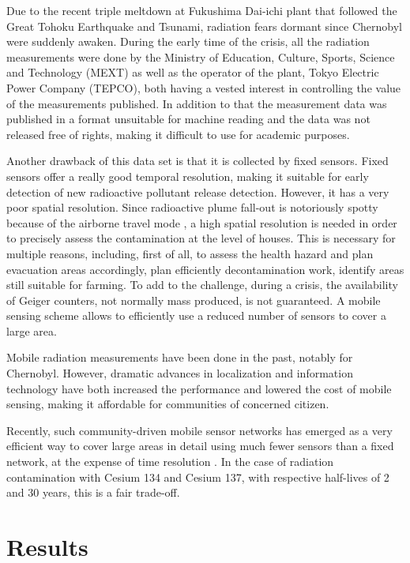 \documentclass[11pt]{article}
\begin{document}
Due to the recent triple meltdown at Fukushima Dai-ichi plant that followed the
Great Tohoku Earthquake and Tsunami, radiation fears dormant since Chernobyl
were suddenly awaken.  During the early time of the crisis, all the radiation
measurements were done by the Ministry of Education, Culture, Sports, Science
and Technology (MEXT) as well as the operator of the plant, Tokyo Electric
Power Company (TEPCO), both having a vested interest in controlling the value
of the measurements published. In addition to that the measurement data was
published in a format unsuitable for machine reading and the data was not
released free of rights, making it difficult to use for academic purposes.

Another drawback of this data set is that it is collected by fixed sensors.
Fixed sensors offer a really good temporal resolution, making it suitable for
early detection of new radioactive pollutant release detection. However, it has
a very poor spatial resolution. Since radioactive plume fall-out is notoriously
spotty because of the airborne travel mode \cite{terada2008development}, a high
spatial resolution is needed in order to precisely assess the contamination at
the level of houses. This is necessary for multiple reasons, including, first
of all, to assess the health hazard and plan evacuation areas accordingly, plan
efficiently decontamination work, identify areas still suitable for farming.
To add to the challenge, during a crisis, the availability of Geiger counters,
not normally mass produced, is not guaranteed. A mobile sensing scheme allows
to efficiently use a reduced number of sensors to cover a large area.

Mobile radiation measurements have been done in the past, notably for
Chernobyl\cite{arvela1990mobile}. However, dramatic advances in localization
and information technology have both increased the performance and lowered the
cost of mobile sensing, making it affordable for communities of concerned
citizen.

Recently, such community-driven mobile sensor networks has emerged as a very
efficient way to cover large areas in detail using much fewer sensors than a
fixed network, at the expense of time resolution \cite{aberer2010opensense}. In
the case of radiation contamination with Cesium 134 and Cesium 137, with
respective half-lives of 2 and 30 years, this is a fair trade-off.

\section*{Results}
\label{sec:results}
\end{document}
